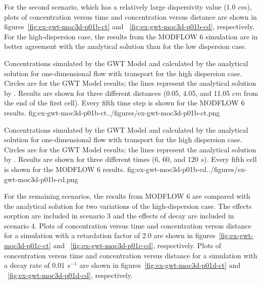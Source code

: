 For the second scenario, which has a relatively large dispersivity value (1.0 $cm$), plots of concentration versus time and concentration versus distance are shown in figures~\ref{fig:ex-gwt-moc3d-p01b-ct} and ~\ref{fig:ex-gwt-moc3d-p01b-cd}, respectively.  For the high-dispersion case, the results from the MODFLOW 6 simulation are in better agreement with the analytical solution than for the low dispersion case.

\begin{StandardFigure}{
                                     Concentrations simulated by the \mf GWT Model and calculated by the analytical solution for one-dimensional flow with transport for the high dispersion case.  Circles are for the GWT Model results; the lines represent the analytical solution by \cite{wexler1992}.  Results are shown for three different distances (0.05, 4.05, and 11.05 $cm$ from the end of the first cell).  Every fifth time step is shown for the MODFLOW 6 results.
                                     }{fig:ex-gwt-moc3d-p01b-ct}{../figures/ex-gwt-moc3d-p01b-ct.png}
\end{StandardFigure}            

\begin{StandardFigure}{
                                     Concentrations simulated by the \mf GWT Model and calculated by the analytical solution for one-dimensional flow with transport for the high dispersion case.  Circles are for the GWT Model results; the lines represent the analytical solution by \cite{wexler1992}.  Results are shown for three different times (6, 60, and 120 $s$).  Every fifth cell is shown for the MODFLOW 6 results.
                                     }{fig:ex-gwt-moc3d-p01b-cd}{../figures/ex-gwt-moc3d-p01b-cd.png}
\end{StandardFigure}            


For the remaining scenarios, the results from MODFLOW 6 are compared with the \cite{wexler1992} analytical solution for two variations of the high-dispersion case.  The effects sorption are included in scenario 3 and the effects of decay are included in scenario 4.  Plots of concentration versus time and concentration versus distance for a simulation with a retardation factor of 2.0 are shown in figures~\ref{fig:ex-gwt-moc3d-p01c-ct} and ~\ref{fig:ex-gwt-moc3d-p01c-cd}, respectively.  Plots of concentration versus time and concentration versus distance for a simulation with a decay rate of 0.01 $s^{-1}$ are shown in figures~\ref{fig:ex-gwt-moc3d-p01d-ct} and ~\ref{fig:ex-gwt-moc3d-p01d-cd}, respectively.

